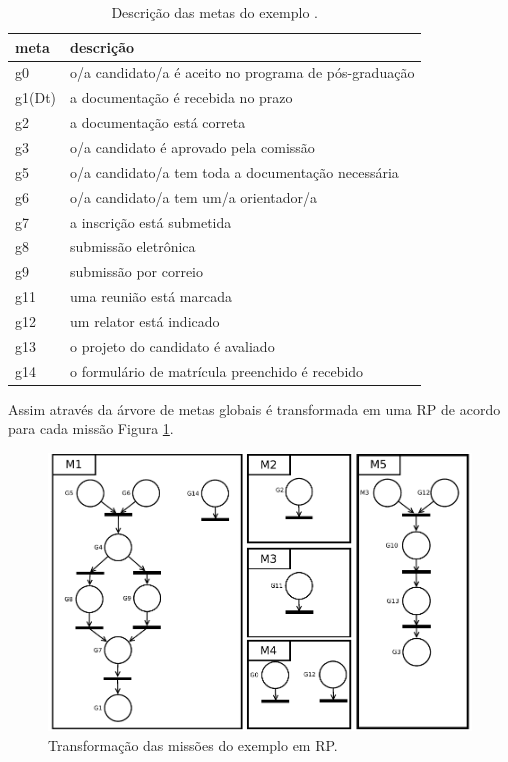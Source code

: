 \begin{table}[ht]
\centering
\caption{Descrição das metas do exemplo \cite{hubner2003modelo}.}
\label{tab:desc_metas}
\begin{tabular}{@{}ll@{}}
\toprule
meta   & descrição                                             \\ \midrule
g0     & o/a candidato/a é aceito no programa de pós-graduação \\
g1(Dt) & a documentação é recebida no prazo                    \\
g2     & a documentação está correta                           \\
g3     & o/a candidato é aprovado pela comissão                \\
g5     & o/a candidato/a tem toda a documentação necessária    \\
g6     & o/a candidato/a tem um/a orientador/a                 \\
g7     & a inscrição está submetida                            \\
g8     & submissão eletrônica                                  \\
g9     & submissão por correio                                 \\
g11    & uma reunião está marcada                              \\
g12    & um relator está indicado                              \\
g13    & o projeto do candidato é avaliado                     \\
g14    & o formulário de matrícula preenchido é recebido      \\ \bottomrule
\end{tabular}
\end{table}


Assim através da árvore de metas globais é transformada em uma RP de acordo para cada missão Figura \ref{fig:missoes_rp}.


\begin{figure}[ht]
\centering
\includegraphics[scale=1]{imagens/RPGoals.pdf}
\caption{Transformação das missões do exemplo em RP.}
\label{fig:missoes_rp}
\end{figure}


